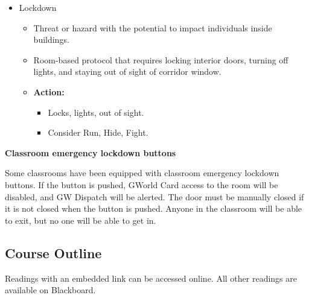 \documentclass[12pt,letterpaper]{article}
\begin{document}
\begin{itemize}
  \item Lockdown
    \begin{itemize}
      \item Threat or hazard with the potential to impact individuals
        inside buildings.
      \item Room-based protocol that requires locking interior doors,
        turning off lights, and staying out of sight of corridor window.
      \item \textbf{Action:}
        \begin{itemize}
          \item Locks, lights, out of sight.
          \item Consider Run, Hide, Fight.
        \end{itemize}
    \end{itemize}
\end{itemize}

\textbf{Classroom emergency lockdown buttons}

Some classrooms have been equipped with classroom emergency lockdown
buttons. If the button is pushed, GWorld Card access to the room will
be disabled, and GW Dispatch will be alerted. The door must be
manually closed if it is not closed when the button is pushed. Anyone
in the classroom will be able to exit, but no one will be able to get in.

\subsection*{Course Outline}

Readings with an embedded link can be accessed online. All other
readings are available on Blackboard.
\end{document}
